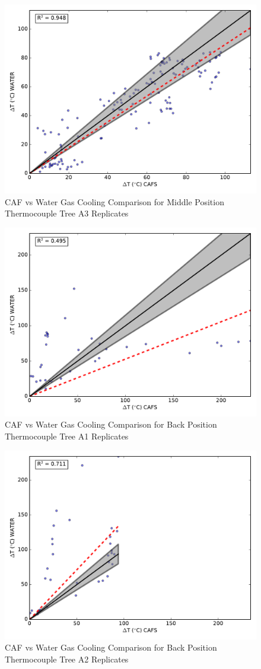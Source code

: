 \documentclass[12pt,oneside]{book}
\begin{document}
\begin{figure}[!ht]
	\includegraphics[width=.7\columnwidth]{../Figures/Gas_Cooling/Combined_mid_A3_scatter}
	\caption{CAF vs Water Gas Cooling Comparison for Middle Position Thermocouple Tree A3 Replicates}
	\label{fig:CAFS_Water_A3_mid}
\end{figure}

\begin{figure}[!ht]
	\includegraphics[width=.7\columnwidth]{../Figures/Gas_Cooling/Combined_fullback_A1_scatter}
	\caption{CAF vs Water Gas Cooling Comparison for Back Position Thermocouple Tree A1 Replicates}
	\label{fig:CAFS_Water_A1_back}
\end{figure}

\begin{figure}[!ht]
	\includegraphics[width=.7\columnwidth]{../Figures/Gas_Cooling/Combined_fullback_A2_scatter}
	\caption{CAF vs Water Gas Cooling Comparison for Back Position Thermocouple Tree A2 Replicates}
	\label{fig:CAFS_Water_A2_back}
\end{figure}
\end{document}
